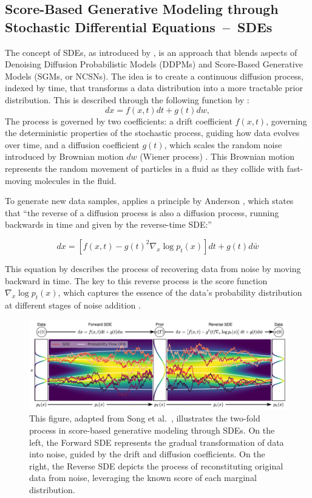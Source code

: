 \subsection{Score-Based Generative Modeling through Stochastic Differential Equations~--~SDEs}\label{SDEs}

The concept of SDEs, as introduced by \citeauthor{song2020score}, is an approach that blends aspects of Denoising Diffusion Probabilistic Models (DDPMs) and Score-Based Generative Models (SGMs, or NCSNs). The idea is to create a continuous diffusion process, indexed by time, that transforms a data distribution into a more tractable prior distribution. This is described through the following function by \citeauthor{song2020score}: \[ dx = f(x, t)dt + g(t)dw, \] The process is governed by two coefficients: a drift coefficient \( f(x, t) \), governing the deterministic properties of the stochastic process, guiding how data evolves over time, and a diffusion coefficient \( g(t) \), which scales the random noise introduced by Brownian motion \( dw \) (Wiener process) \citep{song2020score}. This Brownian motion represents the random movement of particles in a fluid as they collide with fast-moving molecules in the fluid. 

To generate new data samples, \citeauthor{song2020score} applies a principle by Anderson \citep{anderson1982313}, which states that ``the reverse of a diffusion process is also a diffusion process, running backwards in time and given by the reverse-time SDE:\@''

\[ dx = \left[ f(x, t) - g{(t)}^2 \nabla_x \log p_t(x) \right] dt + g(t)d\bar{w} \]

This equation by \citeauthor{song2020score} describes the process of recovering data from noise by moving backward in time. The key to this reverse process is the score function \(\nabla_x \log p_t(x) \), which captures the essence of the data's probability distribution at different stages of noise addition \citep{song2019SGM}.

\begin{figure}[ht]
  \centering
    \includegraphics[width=1\columnwidth]{figures/basics/DiffusionModels_SDEs.png}
    \caption{This figure, adapted from Song et al.~\citep{song2020score}, illustrates the two-fold process in score-based generative modeling through SDEs. On the left, the Forward SDE represents the gradual transformation of data into noise, guided by the drift and diffusion coefficients. On the right, the Reverse SDE depicts the process of reconstituting original data from noise, leveraging the known score of each marginal distribution.}\label{fig:DM_SDEs}
\end{figure}

